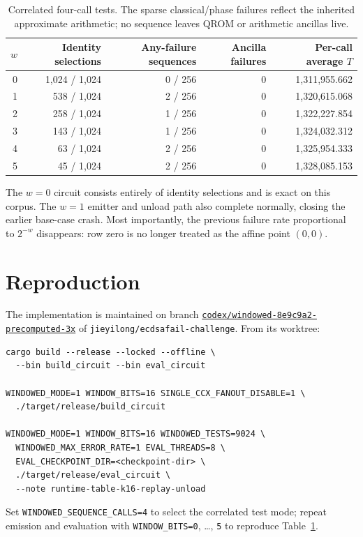 \documentclass[10pt]{article}
\newcommand{\code}[1]{\texttt{#1}}
\begin{document}
\begin{table}[ht]
\centering
\small
\begin{tabular}{@{}rrrrr@{}}
\toprule
$w$ & Identity selections & Any-failure sequences & Ancilla failures & Per-call average $T$ \\
\midrule
0 & 1,024 / 1,024 & 0 / 256 & 0 & 1,311,955.662 \\
1 & 538 / 1,024 & 2 / 256 & 0 & 1,320,615.068 \\
2 & 258 / 1,024 & 1 / 256 & 0 & 1,322,227.854 \\
3 & 143 / 1,024 & 1 / 256 & 0 & 1,324,032.312 \\
4 & 63 / 1,024 & 2 / 256 & 0 & 1,325,954.333 \\
5 & 45 / 1,024 & 2 / 256 & 0 & 1,328,085.153 \\
\bottomrule
\end{tabular}
\caption{Correlated four-call tests. The sparse classical/phase failures reflect the inherited approximate arithmetic; no sequence leaves QROM or arithmetic ancillas live.}
\label{tab:small-window-tests}
\end{table}

The $w=0$ circuit consists entirely of identity selections and is exact on this corpus. The $w=1$ emitter and unload path also complete normally, closing the earlier base-case crash. Most importantly, the previous failure rate proportional to $2^{-w}$ disappears: row zero is no longer treated as the affine point $(0,0)$.

\section{Reproduction}

The implementation is maintained on branch \href{https://github.com/jieyilong/ecdsafail-challenge/tree/codex/windowed-8e9c9a2-precomputed-3x}{\code{codex/windowed-8e9c9a2-precomputed-3x}} of \code{jieyilong/ecdsafail-challenge}. From its worktree:
\begin{lstlisting}
cargo build --release --locked --offline \
  --bin build_circuit --bin eval_circuit

WINDOWED_MODE=1 WINDOW_BITS=16 SINGLE_CCX_FANOUT_DISABLE=1 \
  ./target/release/build_circuit

WINDOWED_MODE=1 WINDOW_BITS=16 WINDOWED_TESTS=9024 \
  WINDOWED_MAX_ERROR_RATE=1 EVAL_THREADS=8 \
  EVAL_CHECKPOINT_DIR=<checkpoint-dir> \
  ./target/release/eval_circuit \
  --note runtime-table-k16-replay-unload
\end{lstlisting}
Set \nolinkurl{WINDOWED_SEQUENCE_CALLS=4} to select the correlated test mode; repeat emission and evaluation with \nolinkurl{WINDOW_BITS=0}, \ldots, \code{5} to reproduce Table~\ref{tab:small-window-tests}.
\end{document}
